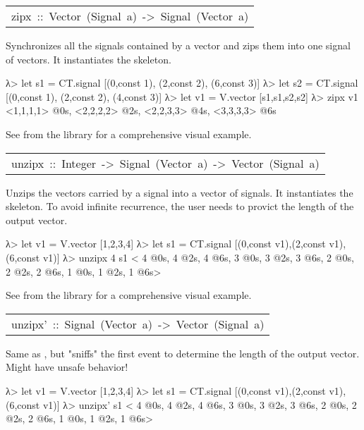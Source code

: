 \begin{haddockdesc}
\begin{interactive}
\end{interactive}\par
           

\item[\begin{tabular}{@{}l}
zipx\ ::\ Vector\ (Signal\ a)\ ->\ Signal\ (Vector\ a)
\end{tabular}]\haddockbegindoc
Synchronizes all the signals contained by a vector and zips them
 into one signal of vectors. It instantiates the
  skeleton.\par
\begin{interactive}
λ> let s1 = CT.signal [(0,const 1), (2,const 2), (6,const 3)]
λ> let s2 = CT.signal [(0,const 1), (2,const 2), (4,const 3)]
λ> let v1 = V.vector [s1,s1,s2,s2]
λ> zipx v1
{ <1,1,1,1> @0s, <2,2,2,2> @2s, <2,2,3,3> @4s, <3,3,3,3> @6s}

\end{interactive}See  from the 
 library for a comprehensive visual example.\par
           

\item[\begin{tabular}{@{}l}
unzipx\ ::\ Integer\ ->\ Signal\ (Vector\ a)\ ->\ Vector\ (Signal\ a)
\end{tabular}]\haddockbegindoc
Unzips the vectors carried by a signal into a vector of
 signals. It instantiates the 
 skeleton. To avoid infinite recurrence, the user needs to provict
 the length of the output vector.\par
\begin{interactive}
λ> let v1 = V.vector [1,2,3,4]
λ> let s1 = CT.signal [(0,const v1),(2,const v1),(6,const v1)]
λ> unzipx 4 s1
<{ 4 @0s, 4 @2s, 4 @6s},{ 3 @0s, 3 @2s, 3 @6s},{ 2 @0s, 2 @2s, 2 @6s},{ 1 @0s, 1 @2s, 1 @6s}>

\end{interactive}See  from the 
 library for a comprehensive visual example.\par
           

\item[\begin{tabular}{@{}l}
unzipx'\ ::\ Signal\ (Vector\ a)\ ->\ Vector\ (Signal\ a)
\end{tabular}]\haddockbegindoc
Same as , but "sniffs" the first event to determine the length of the output vector. Might have unsafe behavior!\par
\begin{interactive}
λ> let v1 = V.vector [1,2,3,4]
λ> let s1 = CT.signal [(0,const v1),(2,const v1),(6,const v1)]
λ> unzipx' s1
<{ 4 @0s, 4 @2s, 4 @6s},{ 3 @0s, 3 @2s, 3 @6s},{ 2 @0s, 2 @2s, 2 @6s},{ 1 @0s, 1 @2s, 1 @6s}>

\end{interactive}
\end{haddockdesc}